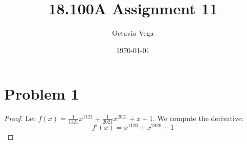 \documentclass{article}
\title{18.100A Assignment 11}
\author{Octavio Vega}
\date\today
\begin{document}
\maketitle
	
\section*{Problem 1}
\begin{proof}
	Let $f(x) = \frac{1}{1121}x^{1121} + \frac{1}{2021}x^{2021} + x + 1$. We compute the derivative:
	\begin{equation}
		f'(x) = x^{1120} + x^{2020} + 1
	\end{equation}
\end{proof}
\end{document}

